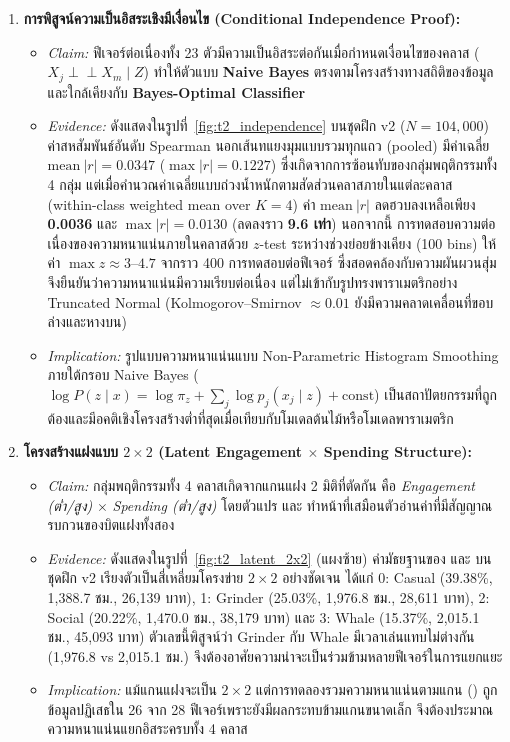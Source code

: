 \begin{enumerate}
  \item \textbf{การพิสูจน์ความเป็นอิสระเชิงมีเงื่อนไข (Conditional Independence Proof):}
  \begin{itemize}
    \item \textit{Claim:} ฟีเจอร์ต่อเนื่องทั้ง 23 ตัวมีความเป็นอิสระต่อกันเมื่อกำหนดเงื่อนไขของคลาส ($X_j \perp\!\!\!\perp X_m \mid Z$) ทำให้ตัวแบบ \textbf{Naive Bayes} ตรงตามโครงสร้างทางสถิติของข้อมูลและใกล้เคียงกับ \textbf{Bayes-Optimal Classifier}
    \item \textit{Evidence:} ดังแสดงในรูปที่~\ref{fig:t2_independence} บนชุดฝึก v2 ($N = 104,000$) ค่าสหสัมพันธ์อันดับ Spearman นอกเส้นทแยงมุมแบบรวมทุกแถว (pooled) มีค่าเฉลี่ย $\mathrm{mean}\ |r| = 0.0347$ ($\max |r| = 0.1227$) ซึ่งเกิดจากการซ้อนทับของกลุ่มพฤติกรรมทั้ง 4 กลุ่ม แต่เมื่อคำนวณค่าเฉลี่ยแบบถ่วงน้ำหนักตามสัดส่วนคลาสภายในแต่ละคลาส (within-class weighted mean over $K=4$) ค่า $\mathrm{mean}\ |r|$ ลดฮวบลงเหลือเพียง \textbf{0.0036} และ $\max |r| = \mathbf{0.0130}$ (ลดลงราว \textbf{9.6 เท่า}) นอกจากนี้ การทดสอบความต่อเนื่องของความหนาแน่นภายในคลาสด้วย $z$-test ระหว่างช่วงย่อยข้างเคียง (100 bins) ให้ค่า $\max z \approx 3\text{--}4.7$ จากราว 400 การทดสอบต่อฟีเจอร์ ซึ่งสอดคล้องกับความผันผวนสุ่ม จึงยืนยันว่าความหนาแน่นมีความเรียบต่อเนื่อง แต่ไม่เข้ากับรูปทรงพาราเมตริกอย่าง Truncated Normal (Kolmogorov--Smirnov $\approx 0.01$ ยังมีความคลาดเคลื่อนที่ขอบล่างและหางบน)
    \item \textit{Implication:} รูปแบบความหนาแน่นแบบ Non-Parametric Histogram Smoothing ภายใต้กรอบ Naive Bayes ($\log P(z \mid x) = \log \pi_z + \sum_j \log p_j(x_j \mid z) + \mathrm{const}$) เป็นสถาปัตยกรรมที่ถูกต้องและมีอคติเชิงโครงสร้างต่ำที่สุดเมื่อเทียบกับโมเดลต้นไม้หรือโมเดลพาราเมตริก
  \end{itemize}

  \item \textbf{โครงสร้างแฝงแบบ $2 \times 2$ (Latent Engagement $\times$ Spending Structure):}
  \begin{itemize}
    \item \textit{Claim:} กลุ่มพฤติกรรมทั้ง 4 คลาสเกิดจากแกนแฝง 2 มิติที่ตัดกัน คือ \textit{Engagement (ต่ำ/สูง)} $\times$ \textit{Spending (ต่ำ/สูง)} โดยตัวแปร  และ  ทำหน้าที่เสมือนตัวอ่านค่าที่มีสัญญาณรบกวนของบิตแฝงทั้งสอง
    \item \textit{Evidence:} ดังแสดงในรูปที่~\ref{fig:t2_latent_2x2} (แผงซ้าย) ค่ามัธยฐานของ  และ  บนชุดฝึก v2 เรียงตัวเป็นสี่เหลี่ยมโครงข่าย $2 \times 2$ อย่างชัดเจน ได้แก่ 0: Casual (39.38\%, 1,388.7 ชม., 26,139 บาท), 1: Grinder (25.03\%, 1,976.8 ชม., 28,611 บาท), 2: Social (20.22\%, 1,470.0 ชม., 38,179 บาท) และ 3: Whale (15.37\%, 2,015.1 ชม., 45,093 บาท) ตัวเลขนี้พิสูจน์ว่า Grinder กับ Whale มีเวลาเล่นแทบไม่ต่างกัน (1,976.8 vs 2,015.1 ชม.) จึงต้องอาศัยความน่าจะเป็นร่วมข้ามหลายฟีเจอร์ในการแยกแยะ
    \item \textit{Implication:} แม้แกนแฝงจะเป็น $2 \times 2$ แต่การทดลองรวมความหนาแน่นตามแกน () ถูกข้อมูลปฏิเสธใน 26 จาก 28 ฟีเจอร์เพราะยังมีผลกระทบข้ามแกนขนาดเล็ก จึงต้องประมาณความหนาแน่นแยกอิสระครบทั้ง 4 คลาส
  \end{itemize}


\end{enumerate}
